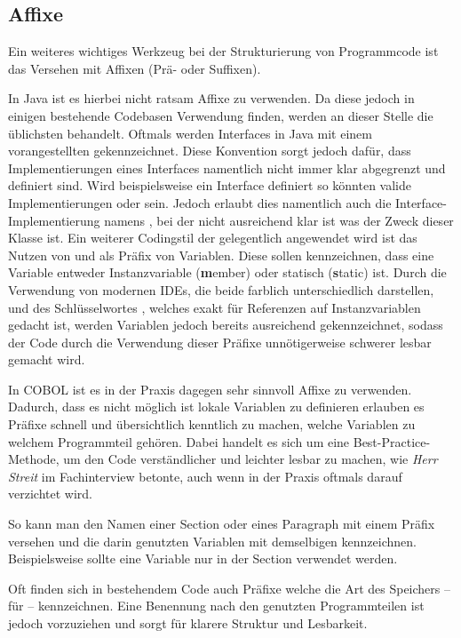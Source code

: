 \subsection{Affixe} \label{affix}\label{affixCOBOL}
Ein weiteres wichtiges Werkzeug bei der Strukturierung von Programmcode ist das Versehen mit Affixen (Prä- oder Suffixen).

In Java ist es hierbei nicht ratsam Affixe zu verwenden. Da diese jedoch in einigen bestehende Codebasen Verwendung finden, werden an dieser Stelle die üblichsten behandelt.
Oftmals werden Interfaces in Java mit einem vorangestellten  gekennzeichnet. Diese Konvention sorgt jedoch dafür, dass Implementierungen eines Interfaces namentlich nicht immer klar abgegrenzt und definiert sind. Wird beispielsweise ein Interface  definiert so könnten valide Implementierungen  oder   sein. Jedoch erlaubt dies namentlich auch die Interface-Implementierung namens , bei der nicht ausreichend klar ist was der Zweck dieser Klasse ist.
Ein weiterer Codingstil der gelegentlich angewendet wird ist das Nutzen von  und  als Präfix von Variablen. Diese sollen kennzeichnen, dass eine Variable entweder Instanzvariable (\textbf{m}ember) oder statisch (\textbf{s}tatic) ist. Durch die Verwendung von modernen IDEs, die beide farblich unterschiedlich darstellen, und des Schlüsselwortes , welches exakt für Referenzen auf Instanzvariablen gedacht ist, werden Variablen jedoch bereits ausreichend gekennzeichnet, sodass der Code durch die Verwendung dieser Präfixe unnötigerweise schwerer lesbar gemacht wird.

In COBOL ist es in der Praxis dagegen sehr sinnvoll Affixe zu verwenden. Dadurch, dass es nicht möglich ist lokale Variablen zu definieren erlauben es Präfixe schnell und übersichtlich kenntlich zu machen, welche Variablen zu welchem Programmteil gehören. Dabei handelt es sich um eine Best-Practice-Methode, um den Code verständlicher und leichter lesbar zu machen, wie \textit{Herr Streit} im Fachinterview betonte, auch wenn in der Praxis oftmals darauf verzichtet wird.

So kann man den Namen einer Section oder eines Paragraph mit einem Präfix versehen und die darin genutzten Variablen mit demselbigen kennzeichnen. Beispielsweise sollte eine Variable  nur in der Section  verwendet werden. 

Oft finden sich in bestehendem Code auch Präfixe welche die Art des Speichers -- \zB {} für  -- kennzeichnen. Eine Benennung nach den genutzten Programmteilen ist jedoch vorzuziehen und sorgt für klarere Struktur und Lesbarkeit.


